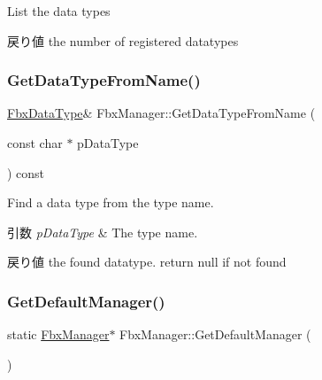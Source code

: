 List the data types \begin{DoxyReturn}{戻り値}
the number of registered datatypes 
\end{DoxyReturn}
\mbox{\label{class_fbx_manager_acdb2f1edb399a590ef97e06221c4764a}} 
\subsubsection{\texorpdfstring{Get\+Data\+Type\+From\+Name()}{GetDataTypeFromName()}}
{\footnotesize\ttfamily \hyperlink{class_fbx_data_type}{Fbx\+Data\+Type}\& Fbx\+Manager\+::\+Get\+Data\+Type\+From\+Name (\begin{DoxyParamCaption}\item[{const char $\ast$}]{p\+Data\+Type }\end{DoxyParamCaption}) const}

Find a data type from the type name. 
\begin{DoxyParams}{引数}
{\em p\+Data\+Type} & The type name. \\
\hline
\end{DoxyParams}
\begin{DoxyReturn}{戻り値}
the found datatype. return null if not found 
\end{DoxyReturn}
\mbox{\label{class_fbx_manager_acfe6f36b0029e3be94c210ad7bde7547}} 
\subsubsection{\texorpdfstring{Get\+Default\+Manager()}{GetDefaultManager()}}
{\footnotesize\ttfamily static \hyperlink{class_fbx_manager}{Fbx\+Manager}$\ast$ Fbx\+Manager\+::\+Get\+Default\+Manager (\begin{DoxyParamCaption}{ }\end{DoxyParamCaption})\hspace{0.3cm}{\ttfamily [static]}}

\mbox{\label{class_fbx_manager_ac9d6e93d2730ef5f4da5a5b99591b99d}} 
